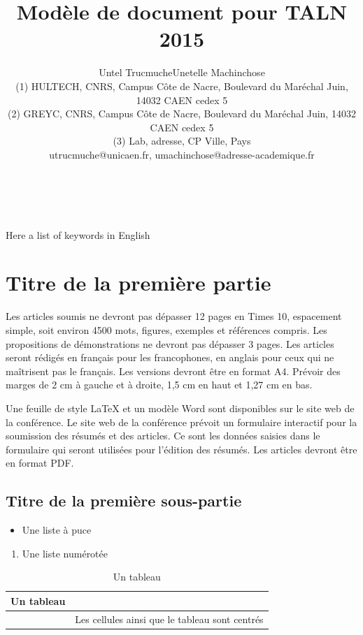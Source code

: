 \documentclass[10pt,a4paper,twoside]{article}
\title{Modèle de document pour TALN 2015}
\author{Untel Trucmuche\up{1, 2}\quad Unetelle Machinchose\up{1, 3}\\
  (1) HULTECH, CNRS, Campus Côte de Nacre, Boulevard du Maréchal Juin, 14032 CAEN cedex 5 \\ 
  (2) GREYC, CNRS, Campus Côte de Nacre, Boulevard du Maréchal Juin, 14032 CAEN cedex 5\\ 
  (3) Lab, adresse, CP Ville, Pays \\ 
  utrucmuche@unicaen.fr, umachinchose@adresse-academique.fr \\ 
}
\begin{document}
\maketitle


\\

\\

{Here a list of keywords in English}


\section{Titre de la première partie}

Les articles soumis ne devront pas dépasser 12 pages en Times 10, espacement simple, soit environ 4500 mots, figures, exemples et références compris. Les propositions de démonstrations ne devront pas dépasser 3 pages. Les articles seront rédigés en français pour les francophones, en anglais pour ceux qui ne maîtrisent pas le français. Les versions devront être en format A4. Prévoir des marges de 2 cm à gauche et à droite, 1,5 cm en haut et 1,27 cm en bas.

Une feuille de style LaTeX et un modèle Word sont disponibles sur le site web de la conférence. Le site web de la conférence prévoit un formulaire interactif pour la soumission des résumés et des articles. Ce sont les données saisies dans le formulaire qui seront utilisées pour l'édition des résumés. Les articles devront être en format PDF. 


\subsection{Titre de la première sous-partie}
\begin{itemize}
\item Une liste à puce 
\end{itemize}
\begin{enumerate}
\item Une liste numérotée
\end{enumerate}

\begin{table}[!h]
\centering
	\begin{tabular}{|c|p{4cm}|}
	\hline
	Un tableau&\\
	\hline
	&Les cellules ainsi que le tableau sont centrés\\
	\hline
	\end{tabular}
\caption{Un tableau}
\end{table}
\end{document}
